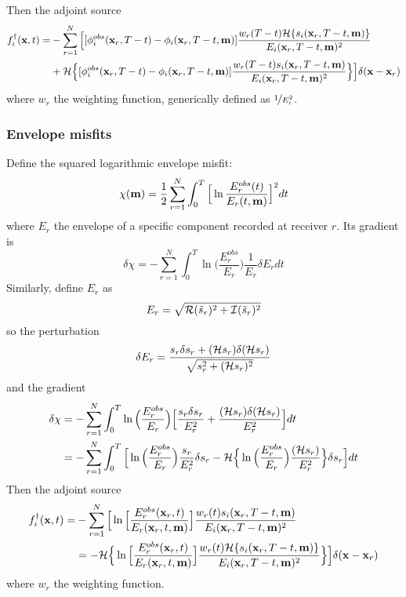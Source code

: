 Then the adjoint source
\begin{align*}
  f_i^\dagger(\mathbf{x},t)= & -\sum_{r=1}^N\Big[[\phi_i^{obs}(\mathbf{x}_r,T-t)-\phi_i(\mathbf{x}_r,T-t,\mathbf{m})]\frac{w_r(T-t)\mathcal{H}\{s_i(\mathbf{x}_r,T-t,\mathbf{m})\}}{E_i(\mathbf{x}_r,T-t,\mathbf{m})^2} \\
    & +\mathcal{H}\Big\{[\phi_i^{obs}(\mathbf{x}_r,T-t)-\phi_i(\mathbf{x}_r,T-t,\mathbf{m})]\frac{w_r(T-t)s_i(\mathbf{x}_r,T-t,\mathbf{m})}{E_i(\mathbf{x}_r,T-t,\mathbf{m})^2}\Big\}\Big]\delta(\mathbf{x}-\mathbf{x}_r) \\
\end{align*}
where $w_r$ the weighting function, generically defined as $\nicefrac{1}{E_i^2}$.\par
\subsubsection{Envelope misfits}
Define the squared logarithmic envelope misfit:
\[ \chi(\mathbf{m})=\frac{1}{2}\sum_{r=1}^N\int_0^T\Big[\ln\frac{E_r^{obs}(t)}{E_r(t,\mathbf{m})}\Big]^2dt \]
where $E_r$ the envelope of a specific component recorded at receiver $r$. Its gradient is
\[ \delta\chi=-\sum_{r=1}^N\int_0^T\ln\Big(\frac{E_r^{obs}}{E_r}\Big)\frac{1}{E_r}\delta E_rdt \]
Similarly, define $E_r$ as
\[ E_r=\sqrt{\mathcal{R}(\tilde s_r)^2+\mathcal{I}(\tilde s_r)^2} \]
so the perturbation
\[ \delta E_r=\frac{s_r\delta s_r+(\mathcal{H} s_r)\delta(\mathcal{H} s_r)}{\sqrt{s_r^2+(\mathcal{H} s_r)^2}} \]
and the gradient
\begin{align*}
  \delta\chi & =-\sum_{r=1}^N\int_0^T\ln\Big(\frac{E_r^{obs}}{E_r}\Big)\Big[\frac{s_r\delta s_r}{E_r^2}+\frac{(\mathcal{H} s_r)\delta(\mathcal{H} s_r)}{E_r^2}\Big]dt \\
    & =-\sum_{r=1}^N\int_0^T\Big[\ln\Big(\frac{E_r^{obs}}{E_r}\Big)\frac{s_r}{E_r^2}\delta s_r-\mathcal{H}\Big\{\ln\Big(\frac{E_r^{obs}}{E_r}\Big)\frac{(\mathcal{H} s_r)}{E_r^2}\Big\}\delta s_r\Big]dt \\
\end{align*}
Then the adjoint source
\begin{align*}
  f_i^\dagger(\mathbf{x},t)= & -\sum_{r=1}^N\Big[\ln\Big[\frac{E_r^{obs}(\mathbf{x}_r,t)}{E_r(\mathbf{x}_r,t,\mathbf{m})}\Big]\frac{w_r(t)s_i(\mathbf{x}_r,T-t,\mathbf{m})}{E_i(\mathbf{x}_r,T-t,\mathbf{m})^2} \\
    & =-\mathcal{H}\Big\{\ln\Big[\frac{E_r^{obs}(\mathbf{x}_r,t)}{E_r(\mathbf{x}_r,t,\mathbf{m})}\Big]\frac{w_r(t)\mathcal{H}\{s_i(\mathbf{x}_r,T-t,\mathbf{m})\}}{E_i(\mathbf{x}_r,T-t,\mathbf{m})^2}\Big\}\Big]\delta(\mathbf{x}-\mathbf{x}_r) \\
\end{align*}
where $w_r$ the weighting function.\par
